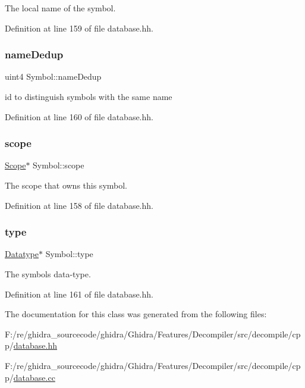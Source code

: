 The local name of the symbol. 



Definition at line 159 of file database.\+hh.

\mbox{\label{class_symbol_afe1f39b8146a552928c3d0d505a03efa}} 
\subsubsection{\texorpdfstring{nameDedup}{nameDedup}}
{\footnotesize\ttfamily uint4 Symbol\+::name\+Dedup\hspace{0.3cm}{\ttfamily [protected]}}



id to distinguish symbols with the same name 



Definition at line 160 of file database.\+hh.

\mbox{\label{class_symbol_a25a177c969ab3aa6b2bbd6e817deb0f4}} 
\subsubsection{\texorpdfstring{scope}{scope}}
{\footnotesize\ttfamily \mbox{\hyperlink{class_scope}{Scope}}$\ast$ Symbol\+::scope\hspace{0.3cm}{\ttfamily [protected]}}



The scope that owns this symbol. 



Definition at line 158 of file database.\+hh.

\mbox{\label{class_symbol_ab760cde69e8bb98988ba37871cb6fd63}} 
\subsubsection{\texorpdfstring{type}{type}}
{\footnotesize\ttfamily \mbox{\hyperlink{class_datatype}{Datatype}}$\ast$ Symbol\+::type\hspace{0.3cm}{\ttfamily [protected]}}



The symbol\textquotesingle{}s data-\/type. 



Definition at line 161 of file database.\+hh.



The documentation for this class was generated from the following files\+:\begin{DoxyCompactItemize}
\item 
F\+:/re/ghidra\+\_\+sourcecode/ghidra/\+Ghidra/\+Features/\+Decompiler/src/decompile/cpp/\mbox{\hyperlink{database_8hh}{database.\+hh}}\item 
F\+:/re/ghidra\+\_\+sourcecode/ghidra/\+Ghidra/\+Features/\+Decompiler/src/decompile/cpp/\mbox{\hyperlink{database_8cc}{database.\+cc}}\end{DoxyCompactItemize}
